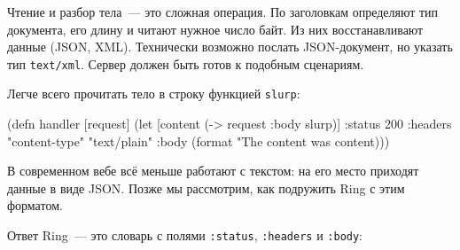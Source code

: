 
Чтение и разбор тела~--- это сложная операция. По заголовкам определяют тип
документа, его длину и читают нужное число байт. Из них восстанавливают данные
(JSON, XML). Технически возможно послать JSON-документ, но указать тип
\verb|text/xml|. Сервер должен быть готов к подобным сценариям.

Легче всего прочитать тело в строку функцией \verb|slurp|:

\ifx\DEVICETYPE\MOBILE

\begin{english}
  \begin{clojure}
(defn handler [request]
 (let [content (-> request :body slurp)]
  {:status 200
   :headers {"content-type" "text/plain"}
   :body (format "The content was %
                 content)}))
  \end{clojure}
\end{english}

\else

\begin{english}
\end{english}

\fi

В современном вебе всё меньше работают с текстом: на его место приходят данные в
виде JSON. Позже мы рассмотрим, как подружить Ring с этим форматом.


Ответ Ring~--- это словарь с полями \verb|:status|, \verb|:headers| и
\verb|:body|:

